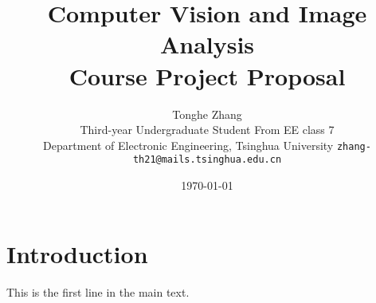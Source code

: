 \documentclass{article}
\title{
Computer Vision and Image Analysis
\protect\\
Course Project Proposal
}
\author{
    Tonghe Zhang    \\
    Third-year Undergraduate Student From EE class 7\\
    Department of Electronic Engineering, Tsinghua University
    \texttt{zhang-th21@mails.tsinghua.edu.cn}\\
}
\date{\today}
\begin{document}
\maketitle

 

\section{Introduction}\label{section_intro_main}
This is the first line in the main text.





\newpage
\onecolumn
\end{document}
